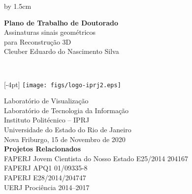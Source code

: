 \begin{titlepage}
\begin{changemargin}{-0.5cm}{-1cm}
\renewcommand{\title}{%
  {\LARGE Assinaturas sinais geométricos}\\[4pt]
  {\LARGE para Reconstrução 3D}
}
\renewcommand{\author}{Cleuber Eduardo do Nascimento Silva}
\newcommand{\info}{%
  \raisebox{4pt}[-4pt]{%
  \texttt{[image: figs/logo-iprj2.eps]} 
  \hspace{0.1in}
  }

  Laboratório de Visualização\\
  Laboratório de Tecnologia da Informação\\
  Instituto Politécnico -- IPRJ\\
  Universidade do Estado do Rio de Janeiro\\[1.5cm]

  Nova Friburgo, 15 de Novembro de 2020\\[1.5cm]

  \textbf{Projetos Relacionados}\\[4pt]
   FAPERJ Jovem Cientista do Nosso Estado E25/2014 204167\\
   FAPERJ APQ1 01/09335-8\\
   FAPERJ E28/2014/204747\\
   UERJ Prociência 2014--2017
}

\newlength{\topToTitle} 
\setlength{\topToTitle}{30pt}

\newlength{\leftToTitle} 
\setlength{\leftToTitle}{-50pt}

\newlength{\titleToInfo} 
\setlength{\titleToInfo}{7cm}

\newlength{\myTextWidth}
\setlength{\myTextWidth}{\textwidth}
\advance\myTextWidth by 1.5cm


\thispagestyle{empty}
\vspace*{\topToTitle}
\begin{minipage}{\myTextWidth}
  \sffamily
  \hspace*{\leftToTitle}\begin{minipage}{60cm}
    \Large\textbf{Plano de Trabalho de Doutorado}\\[1.5cm]
    \title\\[1.5cm]
    \author
  \end{minipage}\\

  \vspace*{\titleToInfo}

  \begin{minipage}{\textwidth}
    \flushright
    \info
  \end{minipage}
\end{minipage}%
\end{changemargin}
\end{titlepage}
